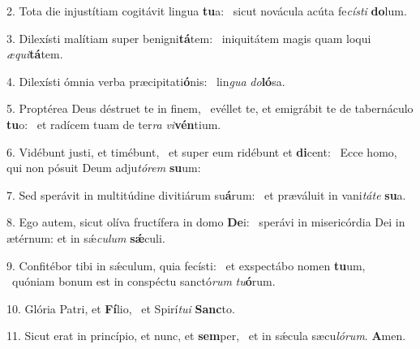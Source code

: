 2. Tota die injustítiam cogitávit lingua \textbf{tu}a: \ast\  sicut novácula acúta fe\textit{cís}\textit{ti} \textbf{do}lum.\

3. Dilexísti malítiam super benigni\textbf{tá}tem: \ast\  iniquitátem magis quam loqui \textit{æ}\textit{qui}\textbf{tá}tem.\

4. Dilexísti ómnia verba præcipitati\textbf{ó}nis: \ast\  lin\textit{gua} \textit{do}\textbf{ló}sa.\

5. Proptérea Deus déstruet te in finem, \dag\  evéllet te, et emigrábit te de tabernáculo \textbf{tu}o: \ast\  et radícem tuam de ter\textit{ra} \textit{vi}\textbf{vén}tium.\

6. Vidébunt justi, et timébunt, \dag\  et super eum ridébunt et \textbf{di}cent: \ast\  Ecce homo, qui non pósuit Deum adju\textit{tó}\textit{rem} \textbf{su}um:\

7. Sed sperávit in multitúdine divitiárum su\textbf{á}rum: \ast\  et præváluit in vani\textit{tá}\textit{te} \textbf{su}a.\

8. Ego autem, sicut olíva fructífera in domo \textbf{De}i: \ast\  sperávi in misericórdia Dei in ætérnum: et in sǽ\textit{cu}\textit{lum} \textbf{sǽ}culi.\

9. Confitébor tibi in sǽculum, quia fecísti: \dag\  et exspectábo nomen \textbf{tu}um, \ast\  quóniam bonum est in conspéctu sanctó\textit{rum} \textit{tu}\textbf{ó}rum.\

10. Glória Patri, et \textbf{Fí}lio, \ast\  et Spirí\textit{tu}\textit{i} \textbf{Sanc}to.\

11. Sicut erat in princípio, et nunc, et \textbf{sem}per, \ast\  et in sǽcula sæcu\textit{ló}\textit{rum}. \textbf{A}men.\

